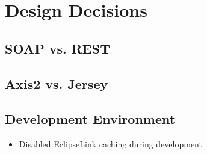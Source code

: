 \chapter{Design Decisions} \label{design-decisions}
\section{SOAP vs. REST} \label{section:soapVsRest}
\section{Axis2 vs. Jersey} \label{section:axis2VsJersey}
\section{Development Environment} \label{section:developmentEnvironment}
\begin{itemize}
	\item Disabled EclipseLink caching during development
\end{itemize}